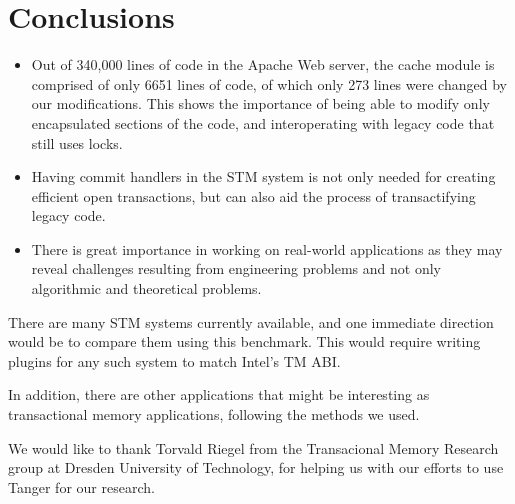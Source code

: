 \documentclass[preprint,11pt]{sigplanconf}
\begin{document}
\section{Conclusions}\label{sec:conclusions}
\begin{itemize}
  \item Out of 340,000 lines of code in the Apache Web server, the cache module
is comprised of only 6651 lines of code, of which only 273 lines were changed by
our modifications. This shows the importance of being able to modify only
encapsulated sections of the code, and interoperating with legacy code that
still uses locks.  
  \item Having commit handlers in the STM system is not only needed for creating
efficient open transactions, but can also aid the process of transactifying
legacy code.
  \item There is great importance in working on real-world applications as they
may reveal challenges resulting from engineering problems and not only
algorithmic and theoretical problems.
\end{itemize}
There are many STM systems currently available, and one immediate direction
would be to compare them using this benchmark. This would require writing
plugins for any such system to match Intel's TM ABI. 

In addition, there are other applications that might be interesting as
transactional memory applications, following the methods we used.



\acks

We would like to thank Torvald Riegel from the Transacional Memory Research
group at Dresden University of Technology, for helping us with our efforts to
use {\sc Tanger} for our research.



%
%


\end{document}

